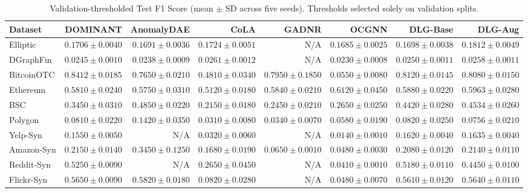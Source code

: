 \documentclass[applsci,article,submit,moreauthors,pdftex]{Definitions/mdpi}
\begin{document}
\begin{table}[H]
\centering\fontsize{7.2pt}{8.5pt}\selectfont\setlength{\tabcolsep}{1.2pt}
\caption{Validation-thresholded Test F1 Score (mean $\pm$ SD across five seeds). Thresholds selected solely on validation splits.}
\label{tab:app_f1_full}
\begin{tabular*}{\textwidth}{@{\extracolsep{\fill}}lrrrrrrr}\toprule
\textbf{Dataset} & \textbf{DOMINANT} & \textbf{AnomalyDAE} & \textbf{CoLA} & \textbf{GADNR} & \textbf{OCGNN} & \textbf{DLG-Base} & \textbf{DLG-Aug} \\\midrule
Elliptic & $0.1706 \pm 0.0040$ & $0.1691 \pm 0.0036$ & $0.1724 \pm 0.0051$ & N/A & $0.1685 \pm 0.0025$ & $0.1698 \pm 0.0038$ & $\mathbf{0.1812 \pm 0.0049}$ \\
DGraphFin & $0.0245 \pm 0.0010$ & $0.0238 \pm 0.0009$ & $\mathbf{0.0261 \pm 0.0012}$ & N/A & $0.0230 \pm 0.0008$ & $0.0250 \pm 0.0011$ & $0.0258 \pm 0.0011$ \\
BitcoinOTC & $\mathbf{0.8412 \pm 0.0185}$ & $0.7650 \pm 0.0210$ & $0.4810 \pm 0.0340$ & $0.7950 \pm 0.1850$ & $0.0550 \pm 0.0080$ & $0.8120 \pm 0.0145$ & $0.8080 \pm 0.0150$ \\
Ethereum & $0.5810 \pm 0.0240$ & $0.5750 \pm 0.0310$ & $0.5120 \pm 0.0180$ & $0.5840 \pm 0.0210$ & $\mathbf{0.6120 \pm 0.0450}$ & $0.5880 \pm 0.0220$ & $0.5963 \pm 0.0280$ \\
BSC & $0.3450 \pm 0.0310$ & $\mathbf{0.4850 \pm 0.0220}$ & $0.2150 \pm 0.0180$ & $0.2450 \pm 0.0210$ & $0.2650 \pm 0.0250$ & $0.4420 \pm 0.0280$ & $0.4534 \pm 0.0260$ \\
Polygon & $0.0810 \pm 0.0220$ & $\mathbf{0.1420 \pm 0.0350}$ & $0.0310 \pm 0.0080$ & $0.0340 \pm 0.0070$ & $0.0580 \pm 0.0190$ & $0.0820 \pm 0.0250$ & $0.0756 \pm 0.0210$ \\
Yelp-Syn & $0.1550 \pm 0.0050$ & N/A & $0.0320 \pm 0.0060$ & N/A & $0.0140 \pm 0.0010$ & $0.1620 \pm 0.0040$ & $\mathbf{0.1635 \pm 0.0040}$ \\
Amazon-Syn & $0.2150 \pm 0.0140$ & $\mathbf{0.3450 \pm 0.1250}$ & $0.1680 \pm 0.0190$ & $0.0650 \pm 0.0010$ & $0.0480 \pm 0.0030$ & $0.2080 \pm 0.0120$ & $0.2140 \pm 0.0110$ \\
Reddit-Syn & $\mathbf{0.5250 \pm 0.0090}$ & N/A & $0.2650 \pm 0.0450$ & N/A & $0.0410 \pm 0.0010$ & $0.5180 \pm 0.0110$ & $0.4450 \pm 0.0100$ \\
Flickr-Syn & $0.5650 \pm 0.0090$ & $\mathbf{0.5820 \pm 0.0180}$ & $0.0820 \pm 0.0280$ & N/A & $0.0480 \pm 0.0070$ & $0.5610 \pm 0.0120$ & $0.5640 \pm 0.0110$ \\

\end{tabular*}
\end{table}
\end{document}
